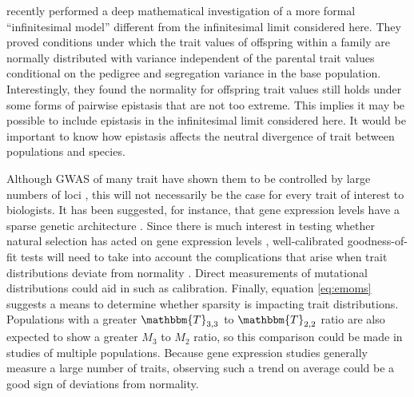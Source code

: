 \citet{Barton2017} recently performed a deep mathematical investigation of a
more formal ``infinitesimal model'' different from the infinitesimal limit
considered here. They proved conditions under which the trait values of
offspring within a family are normally distributed with variance independent of
the parental trait values conditional on the pedigree and segregation variance
in the base population. Interestingly, they found the normality for offspring
trait values still holds under some forms of pairwise epistasis that are not too
extreme. This implies it may be possible to include epistasis in the
infinitesimal limit considered here. It would be important to know how epistasis
affects the neutral divergence of trait between populations and species.

Although GWAS of many trait have shown them to be controlled by large numbers of
loci \citep{Boyle2017}, this will not necessarily be the case for every trait of
interest to biologists. It has been suggested, for instance, that gene
expression levels have a sparse genetic architecture \citep{Wheeler2016}. Since
there is much interest in testing whether natural selection has acted on gene
expression levels \citep{Whitehead2006,Gilad2006,Yang2017}, well-calibrated
goodness-of-fit tests will need to take into account the complications that
arise when trait distributions deviate from normality \citep{Khaitovich2005}.
Direct measurements of mutational distributions \citep{Gruber2012,Metzger2016}
could aid in such as calibration. Finally, equation \eqref{eq:emoms} suggests a
means to determine whether sparsity is impacting trait distributions.
Populations with a greater $\mathbbm{T}_{3,3}$ to $\mathbbm{T}_{2,2}$ ratio are also expected to
show a greater $M_3$ to $M_2$ ratio, so this comparison could be made in studies
of multiple populations. Because gene expression studies generally measure a
large number of traits, observing such a trend on average could be a good sign
of deviations from normality.


